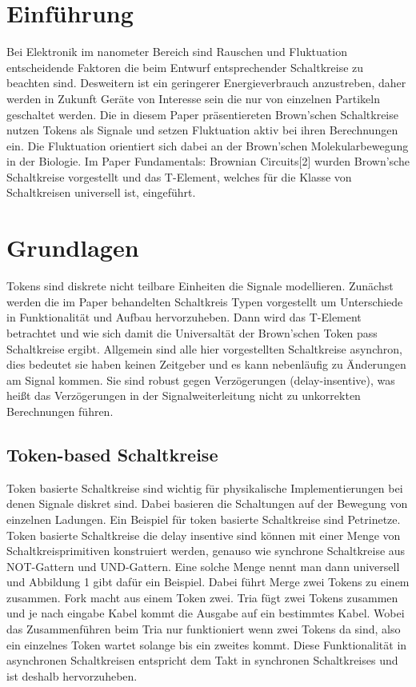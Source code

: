 \documentclass[11pt,a4paper]{article}
\begin{document}
\section{Einführung}
Bei Elektronik im nanometer Bereich sind Rauschen und Fluktuation 
entscheidende Faktoren die beim Entwurf entsprechender Schaltkreise 
zu beachten sind.
%
Desweitern ist ein geringerer Energieverbrauch anzustreben, daher 
werden in Zukunft Geräte von Interesse sein die nur von einzelnen 
Partikeln geschaltet werden.
%
Die in diesem Paper präsentiereten Brown'schen Schaltkreise nutzen Tokens
als Signale und setzen Fluktuation aktiv bei ihren Berechnungen ein.
Die Fluktuation orientiert sich dabei an der Brown'schen Molekularbewegung 
in der Biologie.
%
Im Paper Fundamentals: Brownian Circuits[2] wurden Brown'sche Schaltkreise 
vorgestellt und das T-Element, welches für die Klasse von Schaltkreisen 
universell ist, eingeführt.



\section{Grundlagen}
Tokens sind diskrete nicht teilbare Einheiten die Signale modellieren.
%
Zunächst werden die im Paper behandelten Schaltkreis Typen vorgestellt 
um Unterschiede in Funktionalität und Aufbau hervorzuheben. 
%
Dann wird das T-Element betrachtet und wie sich damit die Universaltät der
Brown'schen Token pass Schaltkreise ergibt.
%
Allgemein sind alle hier vorgestellten Schaltkreise asynchron,
dies bedeutet sie haben keinen Zeitgeber und es kann nebenläufig zu 
Änderungen am Signal kommen.
%
Sie sind robust gegen Verzögerungen (delay-insentive),
was heißt das Verzögerungen in der Signalweiterleitung 
nicht zu unkorrekten Berechnungen führen.


\subsection{Token-based Schaltkreise}
Token basierte Schaltkreise sind wichtig für physikalische Implementierungen
bei denen Signale diskret sind.
%
Dabei basieren die Schaltungen auf der Bewegung
von einzelnen Ladungen. 
%
Ein Beispiel für token basierte Schaltkreise sind Petrinetze. 
%
Token basierte Schaltkreise die delay insentive sind können mit 
einer Menge von Schaltkreisprimitiven konstruiert werden, genauso 
wie synchrone Schaltkreise aus NOT-Gattern und UND-Gattern.
%
Eine solche Menge nennt man dann universell und Abbildung 1 gibt 
dafür ein Beispiel.
%
Dabei führt Merge zwei Tokens zu einem zusammen.
% 
Fork macht aus einem Token zwei.
%
Tria fügt zwei Tokens zusammen und je nach eingabe Kabel kommt
die Ausgabe auf ein bestimmtes Kabel.
%
Wobei das Zusammenführen beim Tria nur funktioniert wenn zwei Tokens da sind,
also ein einzelnes Token wartet solange bis ein zweites kommt.
%
Diese Funktionalität in asynchronen Schaltkreisen entspricht dem Takt in
synchronen Schaltkreises und ist deshalb hervorzuheben.
%
\end{document}
